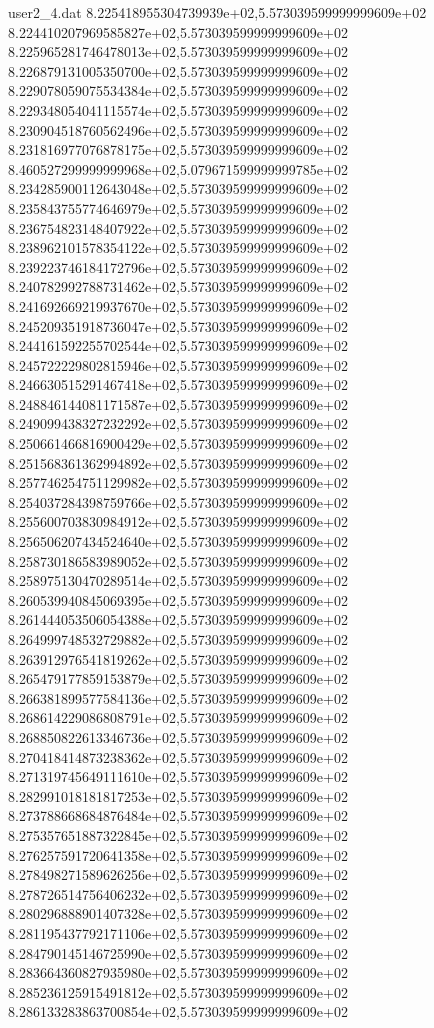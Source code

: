 \begin{filecontents}{user2_4.dat}
8.225418955304739939e+02,5.573039599999999609e+02
8.224410207969585827e+02,5.573039599999999609e+02
8.225965281746478013e+02,5.573039599999999609e+02
8.226879131005350700e+02,5.573039599999999609e+02
8.229078059075534384e+02,5.573039599999999609e+02
8.229348054041115574e+02,5.573039599999999609e+02
8.230904518760562496e+02,5.573039599999999609e+02
8.231816977076878175e+02,5.573039599999999609e+02
8.460527299999999968e+02,5.079671599999999785e+02
8.234285900112643048e+02,5.573039599999999609e+02
8.235843755774646979e+02,5.573039599999999609e+02
8.236754823148407922e+02,5.573039599999999609e+02
8.238962101578354122e+02,5.573039599999999609e+02
8.239223746184172796e+02,5.573039599999999609e+02
8.240782992788731462e+02,5.573039599999999609e+02
8.241692669219937670e+02,5.573039599999999609e+02
8.245209351918736047e+02,5.573039599999999609e+02
8.244161592255702544e+02,5.573039599999999609e+02
8.245722229802815946e+02,5.573039599999999609e+02
8.246630515291467418e+02,5.573039599999999609e+02
8.248846144081171587e+02,5.573039599999999609e+02
8.249099438327232292e+02,5.573039599999999609e+02
8.250661466816900429e+02,5.573039599999999609e+02
8.251568361362994892e+02,5.573039599999999609e+02
8.257746254751129982e+02,5.573039599999999609e+02
8.254037284398759766e+02,5.573039599999999609e+02
8.255600703830984912e+02,5.573039599999999609e+02
8.256506207434524640e+02,5.573039599999999609e+02
8.258730186583989052e+02,5.573039599999999609e+02
8.258975130470289514e+02,5.573039599999999609e+02
8.260539940845069395e+02,5.573039599999999609e+02
8.261444053506054388e+02,5.573039599999999609e+02
8.264999748532729882e+02,5.573039599999999609e+02
8.263912976541819262e+02,5.573039599999999609e+02
8.265479177859153879e+02,5.573039599999999609e+02
8.266381899577584136e+02,5.573039599999999609e+02
8.268614229086808791e+02,5.573039599999999609e+02
8.268850822613346736e+02,5.573039599999999609e+02
8.270418414873238362e+02,5.573039599999999609e+02
8.271319745649111610e+02,5.573039599999999609e+02
8.282991018181817253e+02,5.573039599999999609e+02
8.273788668684876484e+02,5.573039599999999609e+02
8.275357651887322845e+02,5.573039599999999609e+02
8.276257591720641358e+02,5.573039599999999609e+02
8.278498271589626256e+02,5.573039599999999609e+02
8.278726514756406232e+02,5.573039599999999609e+02
8.280296888901407328e+02,5.573039599999999609e+02
8.281195437792171106e+02,5.573039599999999609e+02
8.284790145146725990e+02,5.573039599999999609e+02
8.283664360827935980e+02,5.573039599999999609e+02
8.285236125915491812e+02,5.573039599999999609e+02
8.286133283863700854e+02,5.573039599999999609e+02

\end{filecontents}
